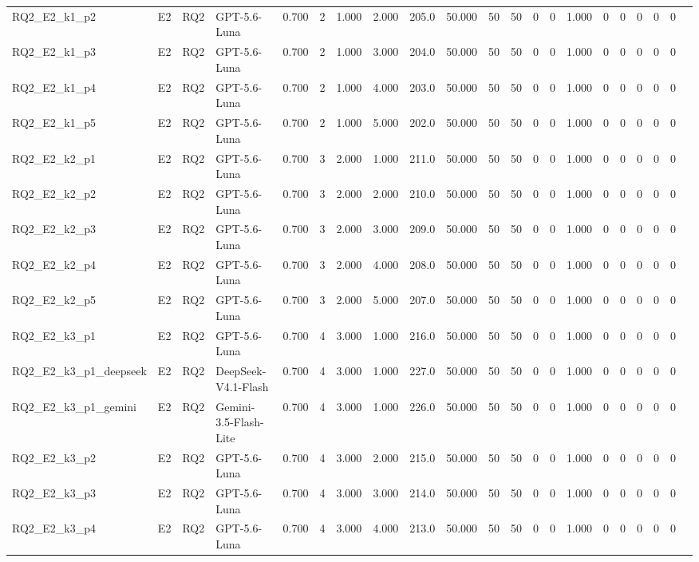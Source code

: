 \begin{table}[htbp]
\begin{tabular}{llllrrrrrrrrrrrrrrrrl}
RQ2\_E2\_k1\_p2 & E2 & RQ2 & GPT-5.6-Luna & 0.700 & 2 & 1.000 & 2.000 & 205.0 & 50.000 & 50 & 50 & 0 & 0 & 1.000 & 0 & 0 & 0 & 0 & 0 &  \\
RQ2\_E2\_k1\_p3 & E2 & RQ2 & GPT-5.6-Luna & 0.700 & 2 & 1.000 & 3.000 & 204.0 & 50.000 & 50 & 50 & 0 & 0 & 1.000 & 0 & 0 & 0 & 0 & 0 &  \\
RQ2\_E2\_k1\_p4 & E2 & RQ2 & GPT-5.6-Luna & 0.700 & 2 & 1.000 & 4.000 & 203.0 & 50.000 & 50 & 50 & 0 & 0 & 1.000 & 0 & 0 & 0 & 0 & 0 &  \\
RQ2\_E2\_k1\_p5 & E2 & RQ2 & GPT-5.6-Luna & 0.700 & 2 & 1.000 & 5.000 & 202.0 & 50.000 & 50 & 50 & 0 & 0 & 1.000 & 0 & 0 & 0 & 0 & 0 &  \\
RQ2\_E2\_k2\_p1 & E2 & RQ2 & GPT-5.6-Luna & 0.700 & 3 & 2.000 & 1.000 & 211.0 & 50.000 & 50 & 50 & 0 & 0 & 1.000 & 0 & 0 & 0 & 0 & 0 &  \\
RQ2\_E2\_k2\_p2 & E2 & RQ2 & GPT-5.6-Luna & 0.700 & 3 & 2.000 & 2.000 & 210.0 & 50.000 & 50 & 50 & 0 & 0 & 1.000 & 0 & 0 & 0 & 0 & 0 &  \\
RQ2\_E2\_k2\_p3 & E2 & RQ2 & GPT-5.6-Luna & 0.700 & 3 & 2.000 & 3.000 & 209.0 & 50.000 & 50 & 50 & 0 & 0 & 1.000 & 0 & 0 & 0 & 0 & 0 &  \\
RQ2\_E2\_k2\_p4 & E2 & RQ2 & GPT-5.6-Luna & 0.700 & 3 & 2.000 & 4.000 & 208.0 & 50.000 & 50 & 50 & 0 & 0 & 1.000 & 0 & 0 & 0 & 0 & 0 &  \\
RQ2\_E2\_k2\_p5 & E2 & RQ2 & GPT-5.6-Luna & 0.700 & 3 & 2.000 & 5.000 & 207.0 & 50.000 & 50 & 50 & 0 & 0 & 1.000 & 0 & 0 & 0 & 0 & 0 &  \\
RQ2\_E2\_k3\_p1 & E2 & RQ2 & GPT-5.6-Luna & 0.700 & 4 & 3.000 & 1.000 & 216.0 & 50.000 & 50 & 50 & 0 & 0 & 1.000 & 0 & 0 & 0 & 0 & 0 &  \\
RQ2\_E2\_k3\_p1\_deepseek & E2 & RQ2 & DeepSeek-V4.1-Flash & 0.700 & 4 & 3.000 & 1.000 & 227.0 & 50.000 & 50 & 50 & 0 & 0 & 1.000 & 0 & 0 & 0 & 0 & 0 &  \\
RQ2\_E2\_k3\_p1\_gemini & E2 & RQ2 & Gemini-3.5-Flash-Lite & 0.700 & 4 & 3.000 & 1.000 & 226.0 & 50.000 & 50 & 50 & 0 & 0 & 1.000 & 0 & 0 & 0 & 0 & 0 &  \\
RQ2\_E2\_k3\_p2 & E2 & RQ2 & GPT-5.6-Luna & 0.700 & 4 & 3.000 & 2.000 & 215.0 & 50.000 & 50 & 50 & 0 & 0 & 1.000 & 0 & 0 & 0 & 0 & 0 &  \\
RQ2\_E2\_k3\_p3 & E2 & RQ2 & GPT-5.6-Luna & 0.700 & 4 & 3.000 & 3.000 & 214.0 & 50.000 & 50 & 50 & 0 & 0 & 1.000 & 0 & 0 & 0 & 0 & 0 &  \\
RQ2\_E2\_k3\_p4 & E2 & RQ2 & GPT-5.6-Luna & 0.700 & 4 & 3.000 & 4.000 & 213.0 & 50.000 & 50 & 50 & 0 & 0 & 1.000 & 0 & 0 & 0 & 0 & 0 &  \\

\end{tabular}
\end{table}
